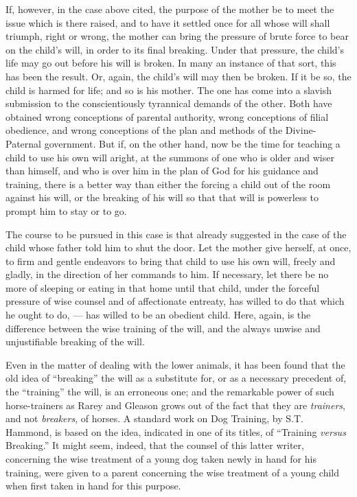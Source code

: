 \documentclass[
]{book}
\begin{document}
If, however, in the case above cited, the purpose of the mother be to meet the issue which is there raised, and to have it settled once for all whose will shall triumph, right or wrong, the mother can bring the pressure of brute force to bear on the child's will, in order to its final breaking. Under that pressure, the child's life may go out before his will is broken. In many an instance of that sort, this has been the result. Or, again, the child's will may then be broken. If it be so, the child is harmed for life; and so is his mother. The one has come into a slavish submission to the conscientiously tyrannical demands of the other. Both have obtained wrong conceptions of parental authority, wrong conceptions of filial obedience, and wrong conceptions of the plan and methods of the Divine-Paternal government. But if, on the other hand, now be the time for teaching a child to use his own will aright, at the summons of one who is older and wiser than himself, and who is over him in the plan of God for his guidance and training, there is a better way than either the forcing a child out of the room against his will, or the breaking of his will so that that will is powerless to prompt him to stay or to go.

The course to be pursued in this case is that already suggested in the case of the child whose father told him to shut the door. Let the mother give herself, at once, to firm and gentle endeavors to bring that child to use his own will, freely and gladly, in the direction of her commands to him. If necessary, let there be no more of sleeping or eating in that home until that child, under the forceful pressure of wise counsel and of affectionate entreaty, has willed to do that which he ought to do, --- has willed to be an obedient child. Here, again, is the difference between the wise training of the will, and the always unwise and unjustifiable breaking of the will.

Even in the matter of dealing with the lower animals, it has been found that the old idea of ``breaking'' the will as a substitute for, or as a necessary precedent of, the ``training'' the will, is an erroneous one; and the remarkable power of such horse-trainers as Rarey and Gleason grows out of the fact that they are \emph{trainers}, and not \emph{breakers}, of horses. A standard work on Dog Training, by S.T. Hammond, is based on the idea, indicated in one of its titles, of ``Training \emph{versus} Breaking.'' It might seem, indeed, that the counsel of this latter writer, concerning the wise treatment of a young dog taken newly in hand for his training, were given to a parent concerning the wise treatment of a young child when first taken in hand for this purpose.
\end{document}
